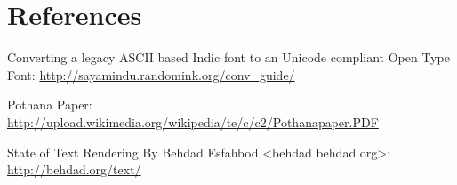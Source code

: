 \chapter{References}

Converting a legacy ASCII based Indic font to an Unicode compliant Open Type Font:
{\url{http://sayamindu.randomink.org/conv_guide/}}

Pothana Paper: {\url{http://upload.wikimedia.org/wikipedia/te/c/c2/Pothanapaper.PDF}}

State of Text Rendering By Behdad Esfahbod <behdad behdad org>: {\url{http://behdad.org/text/}}
